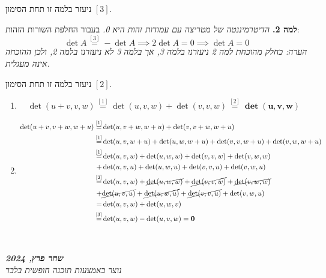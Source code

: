 \documentclass[]{article}
\newcommand\ndoc  {\dotfill \\ \vfil {\begin{center} {\textbf{\textit{שחר פרץ, 2024}} \\ \scriptsize \textit{נוצר באמצעות תוכנה חופשית בלבד}} \end{center}} \vfil	}
\begin{document}
	ניעזר בלמה זו תחת הסימון $[3]$. 
	
	\textbf{למה 2. }	\textit{הדיטרמיננטה של מטריצה עם עמודות זהות היא 0. }בעבור החלפת השורות הזהות: 
	\[ \det A \overset{[3]}{=} -\det A \implies 2\det A = 0 \implies \det A = 0 \]
	\textit{הערה: כחלק מהוכחת למה 2 ניעזרנו בלמה 3, אך בלמה 3 לא ניעזרנו בלמה 2, ולכן ההוכחה אינה מעגלית. }
	
	ניעזר בלמה זו תחת הסימון $[2]$. 
	
	\begin{enumerate}
		\item 
		\[ \det(u + v, v, w) \overset{[1]}{=} \det(u, v, w) + \det(v, v, w) \overset{[2]}{=} \bm{\det(u, v, w)} \]
		\item 
		\begin{align*}
			\det(u + v, v + w, w + u)
			\overset{[1]}{=} &\det(u, v + w, w + u) + \det(v, v + w, w + u) \\
			\overset{[1]}{=} &\det(u, v, w + u) + \det(u, w, w + u) + \det(v, v, w + u) + \det(v, w, w + u) \\
			\overset{[1]}{=} &\det(u, v, w) + \det(u, w, w) + \det(v, v, w) + \det(v, w, w) \\
			+&\det(u, v, u) + \det(u, w, u) + \det(v, v, u) + \det(v, w, u) \\
			\overset{[2]}{=} &\det(u, v, w) + \cancel{\det(u, w, w)} + \cancel{\det(v, v, w)} + \cancel{\det(v, w, w)} \\
			+&\cancel{\det(u, v, u)} + \cancel{\det(u, w, u)} + \cancel{\det(v, v, u)} + \det(v, w, u) \\
			=&\det(u, v, w) + \det(u, w, v) \\
			\overset{[3]}{=}&\det(u, v, w) - \det(u, v, w) = \bm{0}
		\end{align*}
	\end{enumerate}
	
	\ndoc
	
\end{document}

